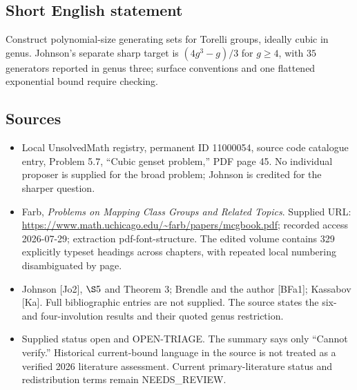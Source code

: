 \documentclass[11pt]{article}
\begin{document}
\subsection{Short English statement}
Construct polynomial-size generating sets for Torelli groups, ideally cubic in genus. Johnson's separate sharp target is \((4g^3-g)/3\) for \(g\geq4\), with \(35\) generators reported in genus three; surface conventions and one flattened exponential bound require checking.
\subsection{Sources}
\begin{itemize}
\item Local UnsolvedMath registry, permanent ID 11000054, source code catalogue entry, Problem 5.7, ``Cubic genset problem,'' PDF page 45. No individual proposer is supplied for the broad problem; Johnson is credited for the sharper question.
\item Farb, \emph{Problems on Mapping Class Groups and Related Topics}. Supplied URL: \url{https://www.math.uchicago.edu/~farb/papers/mcgbook.pdf}; recorded access 2026-07-29; extraction pdf-font-structure. The edited volume contains 329 explicitly typeset headings across chapters, with repeated local numbering disambiguated by page.
\item Johnson [Jo2], \(\S5\) and Theorem 3; Brendle and the author [BFa1]; Kassabov [Ka]. Full bibliographic entries are not supplied. The source states the six- and four-involution results and their quoted genus restriction.
\item Supplied status open and OPEN-TRIAGE. The summary says only ``Cannot verify.'' Historical current-bound language in the source is not treated as a verified 2026 literature assessment. Current primary-literature status and redistribution terms remain NEEDS\_REVIEW.
\end{itemize}
\end{document}

